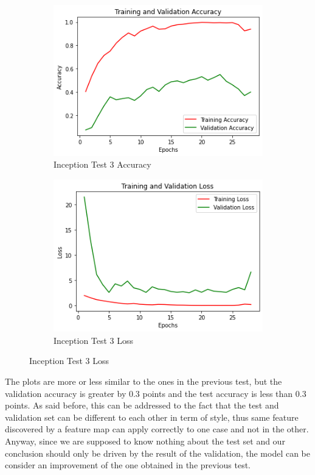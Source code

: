 \begin{figure}[H]
	\begin{subfigure}{0.5\textwidth}
		\includegraphics[width=0.9\linewidth]{img/inception/inceptionft2acc.png} 
		\caption{Inception Test 3 Accuracy}
		\label{fig:inceptionft2acc}
	\end{subfigure}
	\begin{subfigure}{0.5\textwidth}
		\includegraphics[width=0.9\linewidth]{img/inception/inceptionft2loss.png}
		\caption{Inception Test 3 Loss}
		\label{fig:inceptionft2loss}
	\end{subfigure}
\end{figure}

The plots are more or less similar to the ones in the previous test, but the validation accuracy is greater by 0.3 points and the test accuracy is less than 0.3 points. As said before, this can be addressed to the fact that the test and validation set can be different to each other in term of style, thus same feature discovered by a feature map can apply correctly to one case and not in the other. Anyway, since we are supposed to know nothing about the test set and our conclusion should only be driven by the result of the validation, the model can be consider an improvement of the one obtained in the previous test.

